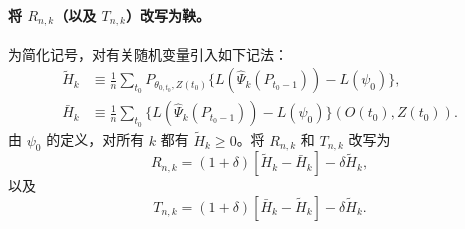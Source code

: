 \paragraph{将 $R_{n,k}$（以及 $T_{n,k}$）改写为鞅。}
为简化记号，对有关随机变量引入如下记法：
\[
\begin{aligned}
\widetilde H_k&\equiv\frac1n\sum_{t_0}P_{\theta_{0,t_0},Z(t_0)}
 \{L(\widehat\Psi_k(P_{t_0-1}))-L(\psi_0)\},\\
\bar H_k&\equiv\frac1n\sum_{t_0}
 \{L(\widehat\Psi_k(P_{t_0-1}))-L(\psi_0)\}(O(t_0),Z(t_0)).
\end{aligned}
\]
由 $\psi_0$ 的定义，对所有 $k$ 都有 $\widetilde H_k\ge0$。将 $R_{n,k}$ 和 $T_{n,k}$ 改写为
\[
R_{n,k}=(1+\delta)[\widetilde H_k-\bar H_k]-\delta\widetilde H_k,
\]
以及
\[
T_{n,k}=(1+\delta)[\bar H_k-\widetilde H_k]-\delta\widetilde H_k.
\]


